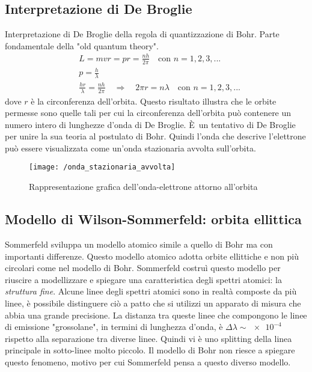 \subsection{Interpretazione di De Broglie}
Interpretazione di De Broglie della regola di quantizzazione di Bohr.
Parte fondamentale della "old quantum theory".
\begin{equation}
\begin{split}
& L = mvr = pr = \frac{ n h }{2 \pi } \quad \mbox{con } n = 1, 2, 3, ... \\
& p = \frac{ h}{\lambda} \\
& \frac{ h r }{\lambda } = \frac{ n h }{2\pi }   \quad\Rightarrow\quad   2\pi r = n \lambda \quad \mbox{con } n = 1, 2, 3, ...
\end{split}
\end{equation}
dove $r$ è la circonferenza dell'orbita.
Questo risultato illustra che le orbite permesse sono quelle tali per cui la circonferenza dell'orbita può contenere un numero intero di lunghezze d'onda di De Broglie.
È un tentativo di De Broglie per unire la sua teoria al postulato di Bohr.
Quindi l'onda che descrive l'elettrone può essere visualizzata come un'onda stazionaria avvolta sull'orbita.
\begin{figure}[h]
\centering
\texttt{[image: /onda\_stazionaria\_avvolta]}
\caption{Rappresentazione grafica dell'onda-elettrone attorno all'orbita}
\end{figure}


\subsection{Modello di Wilson-Sommerfeld: orbita ellittica}
Sommerfeld sviluppa un modello atomico simile a quello di Bohr ma con importanti differenze.
Questo modello atomico adotta orbite ellittiche e non più circolari come nel modello di Bohr.
Sommerfeld costruì questo modello per riuscire a modellizzare e spiegare una caratteristica degli spettri atomici: la \textit{struttura fine}.
Alcune linee degli spettri atomici sono in realtà composte da più linee, è possibile distinguere ciò a patto che si utilizzi un apparato di misura che abbia una grande precisione.
La distanza tra queste linee che compongono le linee di emissione "grossolane", in termini di lunghezza d'onda, è $\Delta \lambda \sim \SI{e-4}{}$ rispetto alla separazione tra diverse linee.
Quindi vi è uno splitting della linea principale in sotto-linee molto piccolo.
Il modello di Bohr non riesce a spiegare questo fenomeno, motivo per cui Sommerfeld pensa a questo diverso modello.

